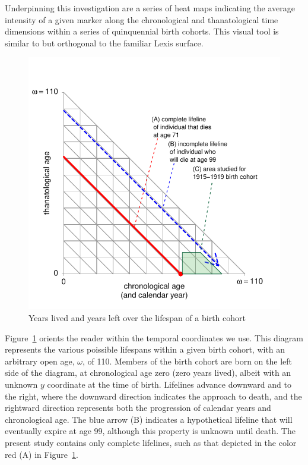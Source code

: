 \documentclass{article}
\begin{document}
Underpinning this investigation are a series of heat maps indicating the
average intensity of a given marker along the chronological and thanatological
time dimensions within a series of quinquennial birth cohorts. This visual tool
is similar to but orthogonal to the familiar Lexis surface.

\begin{figure}[!h]
\centering
\caption{Years lived and years left over the lifespan of a birth cohort}
\label{fig:LexisOrtho}
	\includegraphics{Figures/LexisOrtho.pdf}
\end{figure}

Figure~\ref{fig:LexisOrtho} orients the reader within the temporal coordinates
we use. This diagram represents the various poissible lifespans within a given
birth cohort, with an arbitrary open age, $\omega$, of 110.
Members of the birth cohort are born on the left side of the diagram, at chronological age zero (zero years lived), albeit with an unknown $y$
coordinate at the time of birth.
Lifelines advance downward and to the right, where the downward direction indicates the approach to death, and the
rightward direction represents both the progression of calendar years and
chronological age. The blue arrow (B) indicates a hypothetical lifeline that
will eventually expire at age 99, although this property is unknown until death. The
present study contains only complete lifelines, such as that depicted in the
color red (A) in Figure~\ref{fig:LexisOrtho}.
\end{document}
